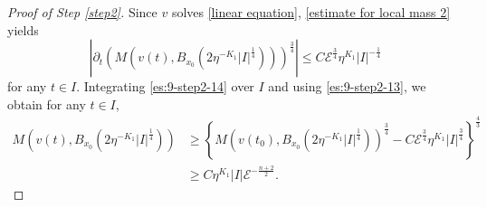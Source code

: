 \documentclass[11pt,a4paper]{article}
\numberwithin{equation}{section}
\begin{document}
\begin{proof}[Proof of Step \ref{step2}]
Since $v$ solves \eqref{linear equation}, \eqref{estimate for local mass 2} yields
\begin{equation}\label{es:9-step2-14}
\left| \partial_{t}\left( M(v(t), B_{x_{0}}(2\eta^{-K_{1}}|I|^{\frac{1}{4}})) \right)^{\frac{3}{4}} \right| \leq C\mathcal{E}^{\frac{3}{4}}\eta^{K_{1}}|I|^{-\frac{1}{4}}
\end{equation}
for any $t \in I$.
Integrating \eqref{es:9-step2-14} over $I$ and using \eqref{es:9-step2-13}, we obtain for any $t \in I$,
\begin{equation}\label{es:9-step2-14-2}
\begin{aligned}
M\left(v(t), B_{x_{0}}(2\eta^{-K_{1}}|I|^{\frac{1}{4}}) \right)
&\geq \left\{ M\left(v(t_{0}), B_{x_{0}}(2\eta^{-K_{1}}|I|^{\frac{1}{4}}) \right)^{\frac{3}{4}} - C\mathcal{E}^{\frac{3}{4}}\eta^{K_{1}}|I|^{\frac{3}{4}} \right\}^{\frac{4}{3}}\\
&\geq  C\eta^{K_{1}}|I|\mathcal{E}^{-\frac{n+2}{2}}.
\end{aligned}
\end{equation}


\end{proof}
\end{document}
